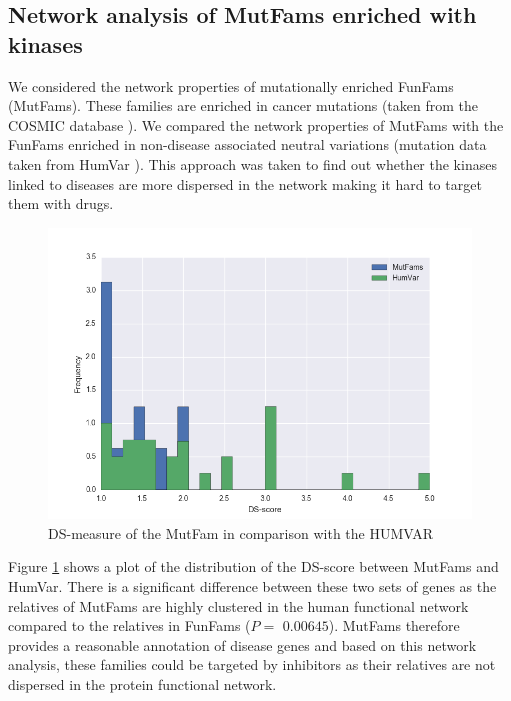 \documentclass[a4paper, 11pt]{report}
\begin{document}
\subsection{Network analysis of MutFams enriched with kinases}
We considered the network properties of mutationally enriched FunFams (MutFams). These families are enriched in cancer mutations (taken from the COSMIC database \cite{bamford2004cosmic}). We compared the network properties of MutFams with the FunFams enriched in non-disease associated neutral variations (mutation data taken from HumVar \cite{capriotti2006predicting}). This approach was taken to find out whether the kinases linked to diseases are more dispersed in the network making it hard to target them with drugs.
\begin{figure}[H]
	\includegraphics[width=\linewidth]{figures/mutvar.png}
	\centering
	\caption{DS-measure of the MutFam in comparison with the HUMVAR}
	\label{mutvar}
\end{figure}
Figure \ref{mutvar} shows a plot of the distribution of the DS-score between MutFams and HumVar. There is a significant difference between these two sets of genes as the relatives of MutFams are highly clustered in the human functional network compared to the relatives in FunFams ($P=$ $0.00645$). MutFams therefore provides a reasonable annotation of disease genes and based on this network analysis, these families could be targeted by inhibitors as their relatives are not dispersed in the protein functional network.
\end{document}
